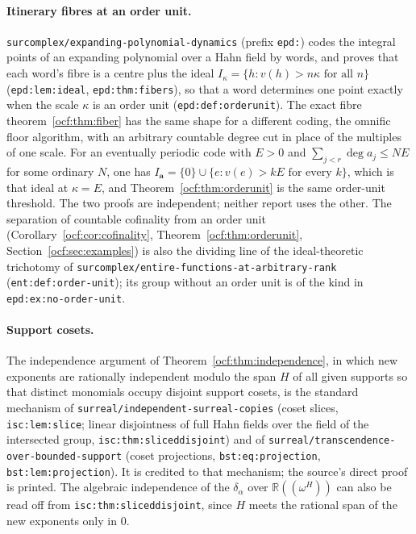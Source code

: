 \documentclass[11pt,a4paper]{article}
\numberwithin{equation}{section}
\theoremstyle{definition}
\theoremstyle{remark}
\newcommand{\R}{\mathbb R}
\newcommand{\dgr}{\operatorname{deg}}
\newcommand{\codea}{\boldsymbol a}
\newcommand{\rpath}[1]{\nolinkurl{#1}}%
\newcommand{\lbl}[1]{\nolinkurl{#1}}%
\begin{document}
\paragraph{Itinerary fibres at an order unit.}
\rpath{surcomplex/expanding-polynomial-dynamics} (prefix \texttt{epd:})
codes the integral points of an expanding polynomial over a Hahn field by
words, and proves that each word's fibre is a centre plus the ideal
$I_\kappa=\{h:v(h)>n\kappa\text{ for all }n\}$ (\lbl{epd:lem:ideal},
\lbl{epd:thm:fibers}), so that a word determines one point exactly when the
scale $\kappa$ is an order unit (\lbl{epd:def:orderunit}). The exact fibre
theorem~\ref{ocf:thm:fiber} has the same shape for a different coding, the
omnific floor algorithm, with an arbitrary countable degree cut in place of
the multiples of one scale. For an eventually periodic code with $E>0$ and
$\sum_{j<r}\dgr a_j\le NE$ for some ordinary $N$, one has
$I_{\codea}=\{0\}\cup\{e:v(e)>kE\text{ for every }k\}$, which is that ideal
at $\kappa=E$, and Theorem~\ref{ocf:thm:orderunit} is the same order-unit
threshold. The two proofs are independent; neither report uses the other.
The separation of countable cofinality from an order unit
(Corollary~\ref{ocf:cor:cofinality}, Theorem~\ref{ocf:thm:orderunit},
Section~\ref{ocf:sec:examples}) is also the dividing line of the
ideal-theoretic trichotomy of
\rpath{surcomplex/entire-functions-at-arbitrary-rank}
(\lbl{ent:def:order-unit}); its group without an order unit is of the kind
in \lbl{epd:ex:no-order-unit}.

\paragraph{Support cosets.} The independence argument of
Theorem~\ref{ocf:thm:independence}, in which new exponents are rationally
independent modulo the span $H$ of all given supports so that distinct
monomials occupy disjoint support cosets, is the standard mechanism of
\rpath{surreal/independent-surreal-copies} (coset slices,
\lbl{isc:lem:slice}; linear disjointness of full Hahn fields over the field
of the intersected group, \lbl{isc:thm:sliceddisjoint}) and of
\rpath{surreal/transcendence-over-bounded-support} (coset projections,
\lbl{bst:eq:projection}, \lbl{bst:lem:projection}). It is credited to that
mechanism; the source's direct proof is printed. The algebraic independence
of the $\delta_\alpha$ over $\R((\omega^H))$ can also be read off from
\lbl{isc:thm:sliceddisjoint}, since $H$ meets the rational span of the new
exponents only in $0$.
\end{document}

